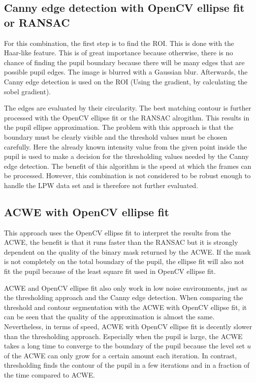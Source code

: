 \subsection{Canny edge detection with OpenCV ellipse fit or RANSAC}
For this combination, the first step is to find the ROI. This is done with the Haar-like feature. This is of great importance because otherwise, there is no chance of finding the pupil boundary because there will be many edges that are possible pupil edges. The image is blurred with a Gaussian blur. Afterwards, the Canny edge detection is used on the ROI (Using the gradient, by calculating the sobel gradient). 

The edges are evaluated by their circularity. The best matching contour is further processed with the OpenCV ellipse fit or the RANSAC alrogithm. This results in the pupil ellipse approximation. The problem with this approach is that the boundary must be clearly visible and the threshold values must be chosen carefully. Here the already known intensity value from the given point inside the pupil is used to make a decision for the thresholding values needed by the Canny edge detection. The benefit of this algorithm is the speed at which the frames can be processed. However, this combination is not considered to be robust enough to handle the LPW data set and is therefore not further evaluated.

\subsection{ACWE with OpenCV ellipse fit}
This approach uses the OpenCV ellipse fit to interpret the results from the ACWE, the benefit is that it runs faster than the RANSAC but it is strongly dependent on the quality of the binary mask returned by the ACWE. If the mask is not completely on the total boundary of the pupil, the ellipse fit will also not fit the pupil because of the least square fit used in OpenCV ellipse fit. 

ACWE and OpenCV ellipse fit also only work in low noise environments, just as the thresholding approach and the Canny edge detection. When comparing the threshold and contour segmentation with the ACWE with OpenCV ellipse fit, it can be seen that the quality of the approximation is almost the same. Nevertheless, in terms of speed, ACWE with OpenCV ellipse fit is decently slower than the thresholding approach. Especially when the pupil is large, the ACWE takes a long time to converge to the boundary of the pupil because the level set $u$ of the ACWE can only grow for a certain amount each iteration. In contrast, thresholding finds the contour of the pupil in a few iterations and in a fraction of the time compared to ACWE.


